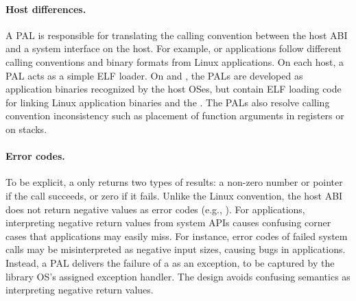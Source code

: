 


\paragraph{Host differences.}
A PAL is responsible for translating the calling convention between the host ABI and a system interface on the host.
For example,
\win{} or \osx{} applications follow different calling conventions and binary formats
from Linux applications.
On each host, a PAL acts as a simple ELF loader.
On \win{} and \osx{}, the PALs are developed as application binaries recognized by the host OSes,
but contain ELF loading code for linking 
Linux application binaries and the \libos{}.
The PALs also resolve calling convention inconsistency
such as placement of function arguments
in registers or on stacks.




\paragraph{Error codes.}
To be explicit, a \hostapi{} only returns two types of results:
a non-zero number or pointer if the call succeeds, or zero if it fails.
Unlike the Linux convention, the host ABI does not return negative values as error codes (e.g., ).
For applications,
interpreting negative return values from system APIs
causes confusing corner cases
that applications may easily miss.
For instance, error codes of failed  system calls may be misinterpreted as
negative input sizes,  
causing bugs in applications.
Instead, a PAL delivers the failure of a \hostapi{}
as an exception, to be captured by the library OS's assigned exception handler.
The design avoids confusing semantics
as interpreting negative return values.



